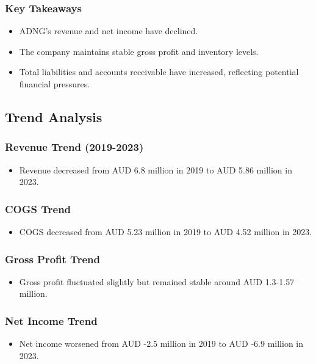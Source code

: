 \documentclass{article}
\begin{document}
\subsubsection{Key Takeaways}
\begin{itemize}
    \item ADNG's revenue and net income have declined.
    \item The company maintains stable gross profit and inventory levels.
    \item Total liabilities and accounts receivable have increased, reflecting potential financial pressures.
\end{itemize}

\subsection{Trend Analysis}
\subsubsection{Revenue Trend (2019-2023)}
\begin{itemize}
    \item Revenue decreased from AUD 6.8 million in 2019 to AUD 5.86 million in 2023.
\end{itemize}

\subsubsection{COGS Trend}
\begin{itemize}
    \item COGS decreased from AUD 5.23 million in 2019 to AUD 4.52 million in 2023.
\end{itemize}

\subsubsection{Gross Profit Trend}
\begin{itemize}
    \item Gross profit fluctuated slightly but remained stable around AUD 1.3-1.57 million.
\end{itemize}

\subsubsection{Net Income Trend}
\begin{itemize}
    \item Net income worsened from AUD -2.5 million in 2019 to AUD -6.9 million in 2023.
\end{itemize}
\end{document}

